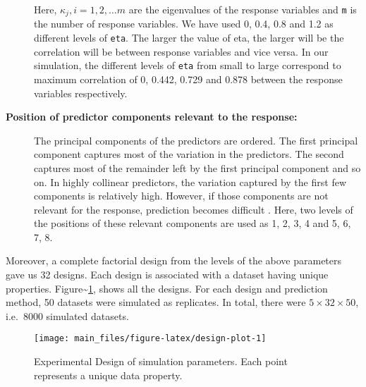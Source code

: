 \documentclass[review]{elsarticle}
\begin{document}
\begin{description}
Here, \(\kappa_j, i = 1, 2, \ldots m\) are the eigenvalues of the response variables and \texttt{m} is the number of response variables. We have used 0, 0.4, 0.8 and 1.2 as different levels of \texttt{eta}. The larger the value of eta, the larger will be the correlation will be between response variables and vice versa. In our simulation, the different levels of \texttt{eta} from small to large correspond to maximum correlation of 0, 0.442, 0.729 and 0.878 between the response variables respectively.
\item[\textbf{Position of predictor components relevant to the response:}]
The principal components of the predictors are ordered. The first principal component captures most of the variation in the predictors. The second captures most of the remainder left by the first principal component and so on. In highly collinear predictors, the variation captured by the first few components is relatively high. However, if those components are not relevant for the response, prediction becomes difficult \citep{Helland1994b}. Here, two levels of the positions of these relevant components are used as 1, 2, 3, 4 and 5, 6, 7, 8.
\end{description}

Moreover, a complete factorial design from the levels of the above parameters gave us 32 designs. Each design is associated with a dataset having unique properties. Figure\textasciitilde\ref{fig:design-plot}, shows all the designs. For each design and prediction method, 50 datasets were simulated as replicates. In total, there were \(5 \times 32 \times 50\), i.e.~8000 simulated datasets.

\begin{figure}
\texttt{[image: main\_files/figure-latex/design-plot-1]} \caption{Experimental Design of simulation parameters. Each point represents a unique data property.}\label{fig:design-plot}
\end{figure}
\end{document}
